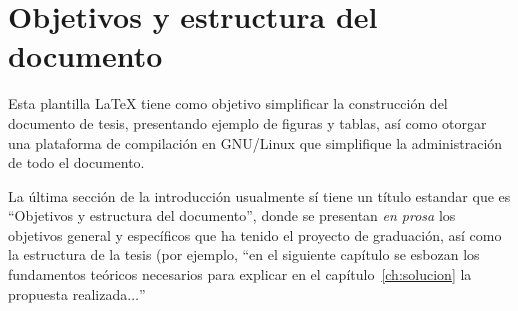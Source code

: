 \section{Objetivos y estructura del documento}

Esta plantilla LaTeX tiene como objetivo simplificar la construcción del
documento de tesis, presentando ejemplo de figuras y tablas, así como otorgar
una plataforma de compilación en GNU/Linux que simplifique la administración de
todo el documento.

La última sección de la introducción usualmente sí tiene un título estandar que
es ``Objetivos y estructura del documento'', donde se presentan \emph{en prosa}
los objetivos general y específicos que ha tenido el proyecto de graduación,
así como la estructura de la tesis (por ejemplo, ``en el siguiente capítulo se
esbozan los fundamentos teóricos necesarios para explicar en el
capítulo~\ref{ch:solucion} la propuesta realizada$\ldots$''

